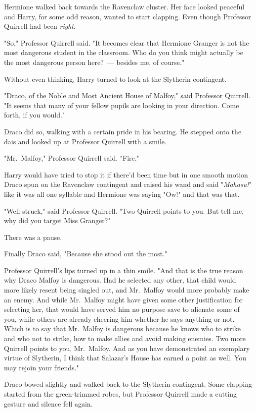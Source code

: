 Hermione walked back towards the Ravenclaw cluster. Her face looked peaceful
and Harry, for some odd reason, wanted to start clapping. Even though Professor
Quirrell had been \emph{right}.

"So," Professor Quirrell said. "It becomes clear that Hermione Granger is not
the most dangerous student in the classroom. Who do you think might actually be
the most dangerous person here?~--- besides me, of course."

Without even thinking, Harry turned to look at the Slytherin contingent.

"Draco, of the Noble and Most Ancient House of Malfoy," said Professor
Quirrell. "It seems that many of your fellow pupils are looking in your
direction. Come forth, if you would."

Draco did so, walking with a certain pride in his bearing. He stepped onto the
dais and looked up at Professor Quirrell with a smile.

"Mr.~Malfoy," Professor Quirrell said. "Fire."

Harry would have tried to stop it if there'd been time but in one smooth motion
Draco spun on the Ravenclaw contingent and raised his wand and said
"\emph{Mahasu!}" like it was all one syllable and Hermione was saying "Ow!" and
that was that.

"Well struck," said Professor Quirrell. "Two Quirrell points to you. But tell
me, why did you target Miss Granger?"

There was a pause.

Finally Draco said, "Because she stood out the most."

Professor Quirrell's lips turned up in a thin smile. "And that is the true
reason why Draco Malfoy is dangerous. Had he selected any other, that child
would more likely resent being singled out, and Mr.~Malfoy would more probably
make an enemy. And while Mr.~Malfoy might have given some other justification
for selecting her, that would have served him no purpose save to alienate some
of you, while others are already cheering him whether he says anything or not.
Which is to say that Mr.~Malfoy is dangerous because he knows who to strike and
who not to strike, how to make allies and avoid making enemies. Two more
Quirrell points to you, Mr.~Malfoy. And as you have demonstrated an exemplary
virtue of Slytherin, I think that Salazar's House has earned a point as well.
You may rejoin your friends."

Draco bowed slightly and walked back to the Slytherin contingent. Some clapping
started from the green-trimmed robes, but Professor Quirrell made a cutting
gesture and silence fell again.

